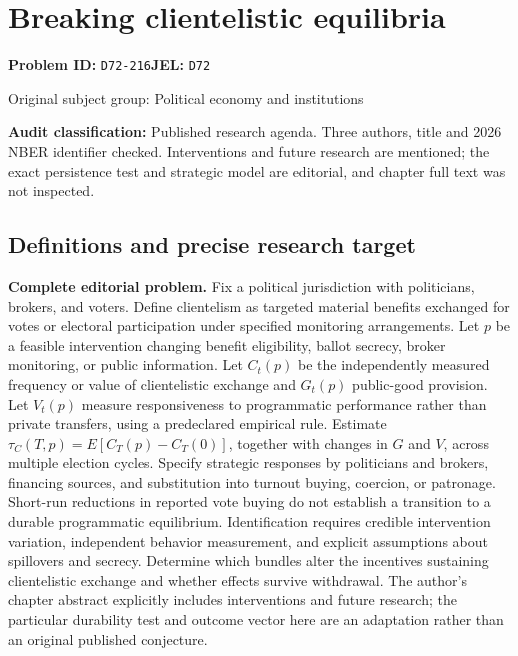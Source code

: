 \documentclass[11pt,a4paper]{article}
\begin{document}
\section*{Breaking clientelistic equilibria}
\textbf{Problem ID:} \texttt{D72-216}\quad \textbf{JEL:} \texttt{D72}\par
\label{problem:OP-0384}
{\sffamily\small\color{muted}Original subject group: Political economy and institutions\par}
\label{definitions:problem:30007666}
\textbf{Audit classification:} Published research agenda. Three authors, title and 2026 NBER identifier checked. Interventions and future research are mentioned; the exact persistence test and strategic model are editorial, and chapter full text was not inspected.
\subsection*{Definitions and precise research target}
\textbf{Complete editorial problem.} Fix a political jurisdiction with politicians, brokers, and voters. Define clientelism as targeted material benefits exchanged for votes or electoral participation under specified monitoring arrangements. Let \(p\) be a feasible intervention changing benefit eligibility, ballot secrecy, broker monitoring, or public information. Let \(C_t(p)\) be the independently measured frequency or value of clientelistic exchange and \(G_t(p)\) public-good provision. Let \(V_t(p)\) measure responsiveness to programmatic performance rather than private transfers, using a predeclared empirical rule. Estimate \(\tau_C(T,p)=E[C_T(p)-C_T(0)]\), together with changes in \(G\) and \(V\), across multiple election cycles. Specify strategic responses by politicians and brokers, financing sources, and substitution into turnout buying, coercion, or patronage. Short-run reductions in reported vote buying do not establish a transition to a durable programmatic equilibrium. Identification requires credible intervention variation, independent behavior measurement, and explicit assumptions about spillovers and secrecy. Determine which bundles alter the incentives sustaining clientelistic exchange and whether effects survive withdrawal. The author's chapter abstract explicitly includes interventions and future research; the particular durability test and outcome vector here are an adaptation rather than an original published conjecture.
\end{document}
